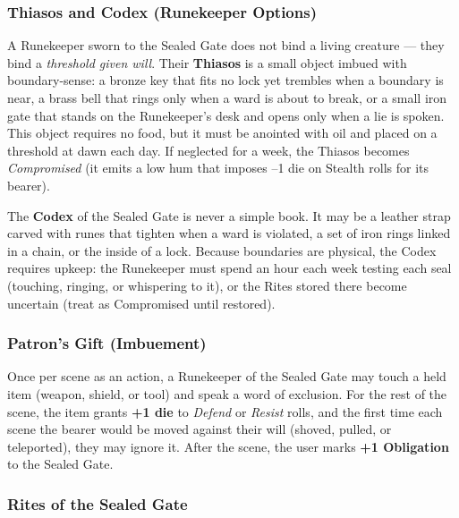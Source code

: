 \subsubsection*{Thiasos and Codex (Runekeeper Options)}

A Runekeeper sworn to the Sealed Gate does not bind a living creature --- they bind a \textit{threshold given will}. Their \textbf{Thiasos} is a small object imbued with boundary-sense: a bronze key that fits no lock yet trembles when a boundary is near, a brass bell that rings only when a ward is about to break, or a small iron gate that stands on the Runekeeper's desk and opens only when a lie is spoken. This object requires no food, but it must be anointed with oil and placed on a threshold at dawn each day. If neglected for a week, the Thiasos becomes \textit{Compromised} (it emits a low hum that imposes --1 die on Stealth rolls for its bearer).

The \textbf{Codex} of the Sealed Gate is never a simple book. It may be a leather strap carved with runes that tighten when a ward is violated, a set of iron rings linked in a chain, or the inside of a lock. Because boundaries are physical, the Codex requires upkeep: the Runekeeper must spend an hour each week testing each seal (touching, ringing, or whispering to it), or the Rites stored there become uncertain (treat as Compromised until restored).

\subsubsection*{Patron's Gift (Imbuement)}

Once per scene as an action, a Runekeeper of the Sealed Gate may touch a held item (weapon, shield, or tool) and speak a word of exclusion. For the rest of the scene, the item grants \textbf{+1 die} to \textit{Defend} or \textit{Resist} rolls, and the first time each scene the bearer would be moved against their will (shoved, pulled, or teleported), they may ignore it. After the scene, the user marks \textbf{+1 Obligation} to the Sealed Gate.

\subsubsection*{Rites of the Sealed Gate}

